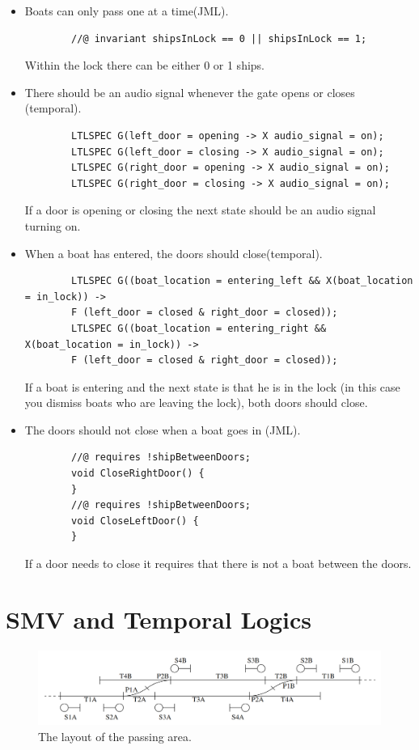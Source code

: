 \documentclass[a4paper]{article}
\begin{document}
\begin{itemize}
		\item Boats can only pass one at a time(JML).
		\begin{lstlisting}
		//@ invariant shipsInLock == 0 || shipsInLock == 1;
		\end{lstlisting}
		Within the lock there can be either 0 or 1 ships.
		
		\item There should be an audio signal whenever the gate opens or closes (temporal).
		\begin{lstlisting}
		LTLSPEC G(left_door = opening -> X audio_signal = on);
		LTLSPEC G(left_door = closing -> X audio_signal = on);
		LTLSPEC G(right_door = opening -> X audio_signal = on);
		LTLSPEC G(right_door = closing -> X audio_signal = on);
		\end{lstlisting}
		If a door is opening or closing the next state should be an audio signal turning on.
		
		\item When a boat has entered, the doors should close(temporal).
		\begin{lstlisting}
		LTLSPEC G((boat_location = entering_left && X(boat_location = in_lock)) ->
		F (left_door = closed & right_door = closed));
		LTLSPEC G((boat_location = entering_right && X(boat_location = in_lock)) ->
		F (left_door = closed & right_door = closed));
		\end{lstlisting}
		If a boat is entering and the next state is that he is in the lock (in this case you dismiss boats who are leaving the lock), both doors should close.
		
		\item The doors should not close when a boat goes in (JML).
		\begin{lstlisting}
		//@ requires !shipBetweenDoors;
		void CloseRightDoor() {
		}
		//@ requires !shipBetweenDoors;
		void CloseLeftDoor() {
		}
		\end{lstlisting}
		If a door needs to close it requires that there is not a boat between the doors.
	\end{itemize}
	
	\section{SMV and Temporal Logics}
	\begin{figure}[h]
		\centering
		\includegraphics[width=\textwidth]{switches.PNG}
		\caption{The layout of the passing area.}
	\end{figure}
	
\end{document}
